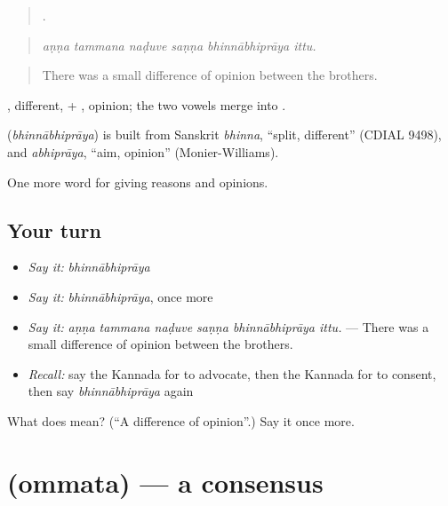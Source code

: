 \begin{quote}
     .
\end{quote}

\begin{quote}
\emph{aṇṇa tammana naḍuve saṇṇa bhinnābhiprāya ittu.}
\end{quote}

\begin{quote}
There was a small difference of opinion between the brothers.
\end{quote}

, different, + , opinion; the two vowels merge into .

\begin{cousinweb}
\textbf{} (\emph{bhinnābhiprāya}) is built from Sanskrit \emph{bhinna}, \textquotedblleft{}split, different\textquotedblright{} (CDIAL 9498), and \emph{abhiprāya}, \textquotedblleft{}aim, opinion\textquotedblright{} (Monier-Williams).
\end{cousinweb}

\begin{grammarlens}[title={What you've built}]
One more word for giving reasons and opinions.
\end{grammarlens}

\subsection*{Your turn}
\begin{itemize}
\raggedright
  \item \emph{Say it:} \emph{bhinnābhiprāya}
  \item \emph{Say it:} \emph{bhinnābhiprāya}, once more
  \item \emph{Say it:} \emph{aṇṇa tammana naḍuve saṇṇa bhinnābhiprāya ittu.} — There was a small difference of opinion between the brothers.
  \item \emph{Recall:} say the Kannada for to advocate, then the Kannada for to consent, then say \emph{bhinnābhiprāya} again
\end{itemize}

\begin{tcolorbox}[breakable,colback=teal!4,colframe=teal!35!black,title={Before you move on}]
What does  mean? (\textquotedblleft{}A difference of opinion\textquotedblright{}.) Say it once more.
\end{tcolorbox}
\section[\texorpdfstring{\kn{ಒಮ್ಮತ} (ommata)}{ಒಮ್ಮತ (ommata)}]{ (ommata) — a consensus}

